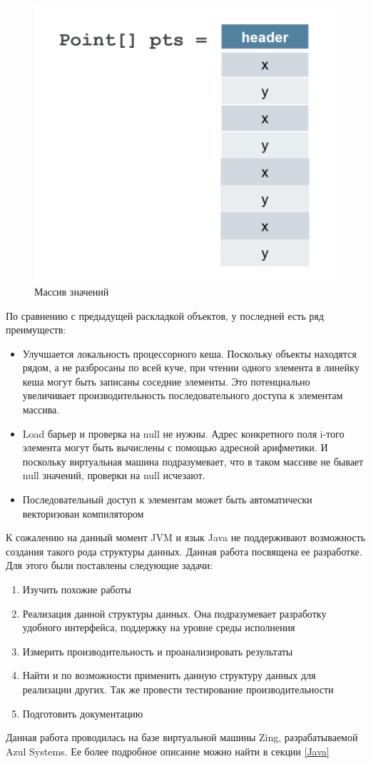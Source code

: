 \begin{figure}[h]
	\caption{Массив значений}\label{values-graph}
	\includegraphics[width=0.65\linewidth]{image/flattened-points.png}
\end{figure}
По сравнению с предыдущей раскладкой объектов, у последней есть ряд преимуществ:
\begin{itemize}
	\item Улучшается локальность процессорного кеша. Поскольку объекты находятся рядом, а не разбросаны по всей куче, при чтении одного элемента в линейку кеша могут быть записаны соседние элементы. Это потенциально увеличивает производительность последовательного доступа к элементам массива.
	\item Load барьер и проверка на null не нужны. Адрес конкретного поля i-того элемента могут быть вычислены с помощью адресной арифметики. И поскольку виртуальная машина подразумевает, что в таком массиве не бывает null значений, проверки на null исчезают.
	\item Последовательный доступ к элементам может быть автоматически векторизован компилятором
\end{itemize}
К сожалению на данный момент JVM и язык Java не поддерживают возможность создания такого рода структуры данных. Данная работа посвящена ее разработке. Для этого были поставлены следующие задачи: 
\begin{enumerate}
	\item Изучить похожие работы
	\item Реализация данной структуры данных. Она подразумевает разработку удобного интерфейса, поддержку на уровне среды исполнения
	\item Измерить производительность и проанализировать результаты
	\item Найти и по возможности применить данную структуру данных для реализации других. Так же провести тестирование производительности
	\item Подготовить документацию  
\end{enumerate}
Данная работа проводилась на базе виртуальной машины Zing, разрабатываемой Azul Systems. Ее более подробное описание можно найти в секции \ref{Java}

\clearpage